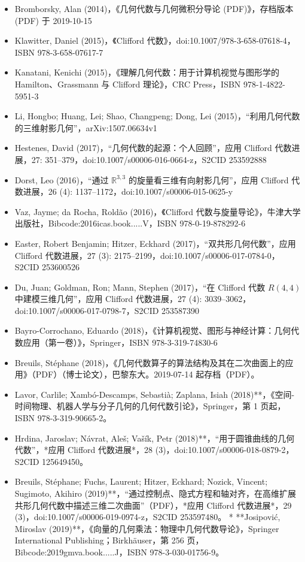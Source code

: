 \begin{itemize}
\item Bromborsky, Alan (2014)，《几何代数与几何微积分导论 (PDF)》，存档版本 (PDF) 于 2019-10-15
\item Klawitter, Daniel (2015)，《Clifford 代数》，doi:10.1007/978-3-658-07618-4，ISBN 978-3-658-07617-7
\item Kanatani, Kenichi (2015)，《理解几何代数：用于计算机视觉与图形学的 Hamilton、Grassmann 与 Clifford 理论》，CRC Press，ISBN 978-1-4822-5951-3
\item Li, Hongbo; Huang, Lei; Shao, Changpeng; Dong, Lei (2015)，“利用几何代数的三维射影几何”，arXiv:1507.06634v1 
\item Hestenes, David (2017)，“几何代数的起源：个人回顾”，应用 Clifford 代数进展，27: 351–379，doi:10.1007/s00006-016-0664-z，S2CID 253592888
\item Dorst, Leo (2016)，“通过⁠ $\mathbb{R}^{3,3}$⁠ 的旋量看三维有向射影几何”，应用 Clifford 代数进展，26 (4): 1137–1172，doi:10.1007/s00006-015-0625-y
\item Vaz, Jayme; da Rocha, Roldão (2016)，《Clifford 代数与旋量导论》，牛津大学出版社，Bibcode:2016icas.book.....V，ISBN 978-0-19-878292-6
\item Easter, Robert Benjamin; Hitzer, Eckhard (2017)，“双共形几何代数”，应用 Clifford 代数进展，27 (3): 2175–2199，doi:10.1007/s00006-017-0784-0，S2CID 253600526
\item Du, Juan; Goldman, Ron; Mann, Stephen (2017)，“在 Clifford 代数 $R(4,4)$ 中建模三维几何”，应用 Clifford 代数进展，27 (4): 3039–3062，doi:10.1007/s00006-017-0798-7，S2CID 253587390
\item Bayro-Corrochano, Eduardo (2018)，《计算机视觉、图形与神经计算：几何代数应用（第一卷）》，Springer，ISBN 978-3-319-74830-6
\item Breuils, Stéphane (2018)，《几何代数算子的算法结构及其在二次曲面上的应用》（PDF）（博士论文），巴黎东大。2019-07-14 起存档（PDF）。
\item Lavor, Carlile; Xambó-Descamps, Sebastià; Zaplana, Isiah (2018)**，《空间-时间物理、机器人学与分子几何的几何代数引论》，Springer，第 1 页起，ISBN 978-3-319-90665-2。
\item Hrdina, Jaroslav; Návrat, Aleš; Vašík, Petr (2018)**，“用于圆锥曲线的几何代数”，*应用 Clifford 代数进展*，28 (3)，doi:10.1007/s00006-018-0879-2，S2CID 125649450。
\item Breuils, Stéphane; Fuchs, Laurent; Hitzer, Eckhard; Nozick, Vincent; Sugimoto, Akihiro (2019)**，“通过控制点、隐式方程和轴对齐，在高维扩展共形几何代数中描述三维二次曲面”（PDF），*应用 Clifford 代数进展*，29 (3)，doi:10.1007/s00006-019-0974-z，S2CID 253597480。
* **Josipović, Miroslav (2019)**，《向量的几何乘法：物理中几何代数导论》，Springer International Publishing；Birkhäuser，第 256 页，Bibcode:2019gmva.book.....J，ISBN 978-3-030-01756-9。

\end{itemize}
